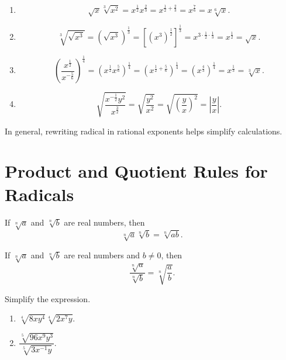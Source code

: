 \documentclass[en,12pt]{elegantbook}
\providecommand{\tightlist}{%
  \setlength{\itemsep}{0pt}\setlength{\parskip}{0pt}}
\newenvironment{rmdnote}{
    \par\noindent
    \makebox[-\width][r]{
    \tiny\color{red!90}
    \textdbend
    \hspace*{2pt}
    }
    \makebox[\width][l]{
        \hspace*{3pt}
        \textbf{
            \color{second}
            Note 
        }
    }
    \begin{shaded}
    \itshape
}{
    \par
    \end{shaded}
}
\providecommand{\tightlist}{%
  \setlength{\itemsep}{0pt}\setlength{\parskip}{0pt}}
\let\BeginKnitrBlock\begin \let\EndKnitrBlock\end
\begin{document}
\BeginKnitrBlock{solution}


\begin{enumerate}
\def\labelenumi{\arabic{enumi}.}
\tightlist
\item
  \[\sqrt{x}\sqrt[3]{x^2}=x^{\frac12}x^{\frac{2}{3}}=x^{\frac{1}{2}+\frac{2}{3}}=x^\frac{7}{6}=x\sqrt[6]{x}.\]
\item
  \[
  \sqrt[3]{\sqrt{x^3}}=(\sqrt{x^3})^\frac{1}{3}=[(x^3)^{\frac{1}{2}}]^{\frac{1}{3}}=x^{3\cdot\frac{1}{2}\cdot\frac{1}{3}}=x^{\frac{1}{2}}=\sqrt{x}.
  \]
\item
  \[
  \left(\frac{x^{\frac12}}{x^{-\frac56}}\right)^{\frac14}=(x^{\frac12}x^{\frac56})^{\frac14}=(x^{\frac{1}{2}+\frac{5}{6}})^{\frac{1}{4}}=(x^\frac{4}{3})^{\frac{1}{4}}=x^{\frac{1}{3}}=\sqrt[3]{x}.
  \]
\item
  \[
  \sqrt{\frac{x^{-\frac12}y^2}{x^{\frac32}}}=\sqrt{\frac{y^2}{x^2}}=\sqrt{\left(\frac yx\right)^2}=\left|\frac yx\right|.
  \]
\end{enumerate}
\EndKnitrBlock{solution}

\begin{rmdnote}

In general, rewriting radical in rational exponents helps simplify calculations.

\end{rmdnote}

\hypertarget{product-and-quotient-rules-for-radicals}{%
\section{Product and Quotient Rules for Radicals}\label{product-and-quotient-rules-for-radicals}}

If \(\sqrt[n]{a}\) and \(\sqrt[n]{b}\) are real numbers, then
\[{\sqrt[n]a}{\sqrt[n]b}=\sqrt[n]{ab}.\]

If \(\sqrt[n]a\) and \(\sqrt[n]b\) are real numbers and \(b\neq 0\), then
\[\dfrac{\sqrt[n]a}{\sqrt[n]b}=\sqrt[n]{\dfrac ab}.\]

\BeginKnitrBlock{example}
\protect\hypertarget{exm:unnamed-chunk-73}{}{\label{exm:unnamed-chunk-73} }
Simplify the expression.

\begin{enumerate}
\def\labelenumi{\arabic{enumi}.}
\tightlist
\item
  \(\sqrt[4]{8xy^4}\sqrt[4]{2x^7y}\).
\item
  \(\dfrac{\sqrt[5]{96x^9y^3}}{\sqrt[5]{3x^{-1}y}}\).
\end{enumerate}
\EndKnitrBlock{example}
\end{document}
